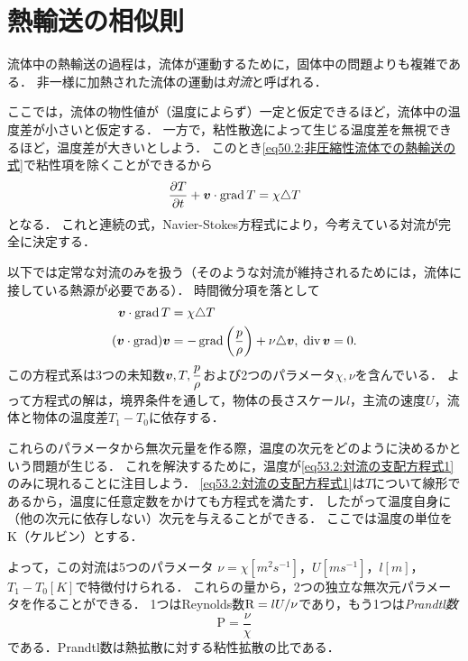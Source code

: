 \section{熱輸送の相似則}

流体中の熱輸送の過程は，流体が運動するために，固体中の問題よりも複雑である．
非一様に加熱された流体の運動は\emph{対流}と呼ばれる．



ここでは，流体の物性値が（温度によらず）一定と仮定できるほど，流体中の温度差が小さいと仮定する．
一方で，粘性散逸によって生じる温度差を無視できるほど，温度差が大きいとしよう．
このとき\eqref{eq50.2:非圧縮性流体での熱輸送の式}で粘性項を除くことができるから
\begin{equation}
    \pdv{T}{t} + \vb*{v} \cdot \operatorname{grad} T = \chi \triangle T 
\end{equation}
となる．
これと連続の式，Navier-Stokes方程式により，今考えている対流が完全に決定する．


以下では定常な対流のみを扱う（そのような対流が維持されるためには，流体に接している熱源が必要である）．
時間微分項を落として
\begin{align}
    \vb*{v} \cdot \operatorname{grad} T &= \chi \triangle T \label{eq53.2:対流の支配方程式1} \\
    (\vb*{v} \cdot \operatorname{grad}) \vb*{v} &= - \operatorname{grad} \left( \frac{p}{\rho} \right) + \nu \triangle \vb*{v}, \;
    \operatorname{div} \vb*{v} = 0.
\end{align}
この方程式系は3つの未知数$\vb*{v}, T, \dfrac{p}{\rho}$および2つのパラメータ$\chi, \nu$を含んでいる．
よって方程式の解は，境界条件を通して，物体の長さスケール$l$，主流の速度$U$，流体と物体の温度差$T_1-T_0$に依存する．

これらのパラメータから無次元量を作る際，温度の次元をどのように決めるかという問題が生じる．
これを解決するために，温度が\eqref{eq53.2:対流の支配方程式1}のみに現れることに注目しよう．
\eqref{eq53.2:対流の支配方程式1}は$T$について線形であるから，温度に任意定数をかけても方程式を満たす．
したがって温度自身に（他の次元に依存しない）次元を与えることができる．
ここでは温度の単位をK（ケルビン）とする．




よって，この対流は5つのパラメータ
$\nu=\chi [\si{m^2s^{-1}}]$，$U[\si{m s^{-1}}]$，$l[\si{m}]$，$T_1-T_0[\si{K}]$で特徴付けられる．
これらの量から，2つの独立な無次元パラメータを作ることができる．
1つはReynolds数$\mathrm{R} = lU/\nu$であり，もう1つは\emph{Prandtl数}
\begin{equation}
    \mathrm{P} = \frac{\nu}{\chi}
\end{equation}
である．Prandtl数は熱拡散に対する粘性拡散の比である．

